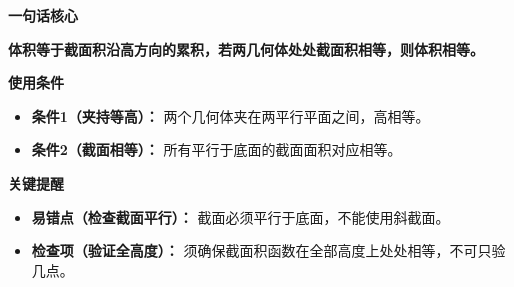 \begin{summarybox}
	\textbf{\textcolor{CSummary}{一句话核心}}

	\textbf{体积等于截面积沿高方向的累积，若两几何体处处截面积相等，则体积相等。}

	\medskip
	\textbf{\textcolor{CSummary}{使用条件}}
	\begin{itemize}[leftmargin=*, itemsep=0.5em, topsep=0.4em]
		\item \textbf{条件1（夹持等高）：} 两个几何体夹在两平行平面之间，高相等。
		\item \textbf{条件2（截面相等）：} 所有平行于底面的截面面积对应相等。
	\end{itemize}

	\medskip
	\textbf{\textcolor{CSummary}{关键提醒}}
	\begin{itemize}[leftmargin=*, itemsep=0.5em, topsep=0.4em]
		\item \textbf{易错点（检查截面平行）：} 截面必须平行于底面，不能使用斜截面。
		\item \textbf{检查项（验证全高度）：} 须确保截面积函数在全部高度上处处相等，不可只验几点。
	\end{itemize}
\end{summarybox}

